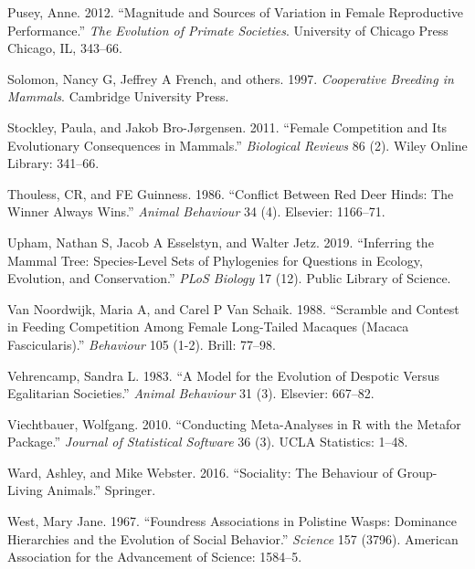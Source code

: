 \documentclass[]{article}
\begin{document}
\leavevmode\hypertarget{ref-pusey2012magnitude}{}%
Pusey, Anne. 2012. ``Magnitude and Sources of Variation in Female
Reproductive Performance.'' \emph{The Evolution of Primate Societies}.
University of Chicago Press Chicago, IL, 343--66.

\leavevmode\hypertarget{ref-solomon1997cooperative}{}%
Solomon, Nancy G, Jeffrey A French, and others. 1997. \emph{Cooperative
Breeding in Mammals}. Cambridge University Press.

\leavevmode\hypertarget{ref-stockley2011female}{}%
Stockley, Paula, and Jakob Bro-Jørgensen. 2011. ``Female Competition and
Its Evolutionary Consequences in Mammals.'' \emph{Biological Reviews} 86
(2). Wiley Online Library: 341--66.

\leavevmode\hypertarget{ref-thouless1986conflict}{}%
Thouless, CR, and FE Guinness. 1986. ``Conflict Between Red Deer Hinds:
The Winner Always Wins.'' \emph{Animal Behaviour} 34 (4). Elsevier:
1166--71.

\leavevmode\hypertarget{ref-upham2019inferring}{}%
Upham, Nathan S, Jacob A Esselstyn, and Walter Jetz. 2019. ``Inferring
the Mammal Tree: Species-Level Sets of Phylogenies for Questions in
Ecology, Evolution, and Conservation.'' \emph{PLoS Biology} 17 (12).
Public Library of Science.

\leavevmode\hypertarget{ref-van1988scramble}{}%
Van Noordwijk, Maria A, and Carel P Van Schaik. 1988. ``Scramble and
Contest in Feeding Competition Among Female Long-Tailed Macaques (Macaca
Fascicularis).'' \emph{Behaviour} 105 (1-2). Brill: 77--98.

\leavevmode\hypertarget{ref-vehrencamp1983model}{}%
Vehrencamp, Sandra L. 1983. ``A Model for the Evolution of Despotic
Versus Egalitarian Societies.'' \emph{Animal Behaviour} 31 (3).
Elsevier: 667--82.

\leavevmode\hypertarget{ref-viechtbauer2010conducting}{}%
Viechtbauer, Wolfgang. 2010. ``Conducting Meta-Analyses in R with the
Metafor Package.'' \emph{Journal of Statistical Software} 36 (3). UCLA
Statistics: 1--48.

\leavevmode\hypertarget{ref-ward2016sociality}{}%
Ward, Ashley, and Mike Webster. 2016. ``Sociality: The Behaviour of
Group-Living Animals.'' Springer.

\leavevmode\hypertarget{ref-west1967foundress}{}%
West, Mary Jane. 1967. ``Foundress Associations in Polistine Wasps:
Dominance Hierarchies and the Evolution of Social Behavior.''
\emph{Science} 157 (3796). American Association for the Advancement of
Science: 1584--5.
\end{document}

